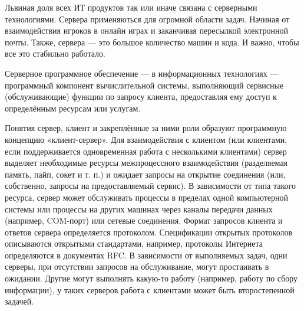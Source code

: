 
Львиная доля всех ИТ продуктов так или иначе связана с серверными технологиями. Сервера применяються для огромной области задач. Начиная от  взаимодействия игроков в онлайн играх и заканчивая пересылкой электронной почты. Также, сервера — это большое количество машин и кода. И важно, чтобы все это стабильно работало. 

Серверное программное обеспечение — в информационных технологиях — программный компонент вычислительной системы, выполняющий сервисные (обслуживающие) функции по запросу клиента, предоставляя ему доступ к определённым ресурсам или услугам.
	 	 	
Понятия сервер, клиент и закреплённые за ними роли образуют программную концепцию «клиент-сервер».
Для взаимодействия с клиентом (или клиентами, если поддерживается одновременная работа с несколькими клиентами) сервер выделяет необходимые ресурсы межпроцессного взаимодействия (разделяемая память, пайп, сокет и т. п.) и ожидает запросы на открытие соединения (или, собственно, запросы на предоставляемый сервис). В зависимости от типа такого ресурса, сервер может обслуживать процессы в пределах одной компьютерной системы или процессы на других машинах через каналы передачи данных (например, COM-порт) или сетевые соединения.
Формат запросов клиента и ответов сервера определяется протоколом. Спецификации открытых протоколов описываются открытыми стандартами, например, протоколы Интернета определяются в документах RFC.
В зависимости от выполняемых задач, одни серверы, при отсутствии запросов на обслуживание, могут простаивать в ожидании. Другие могут выполнять какую-то работу (например, работу по сбору информации), у таких серверов работа с клиентами может быть второстепенной задачей.



